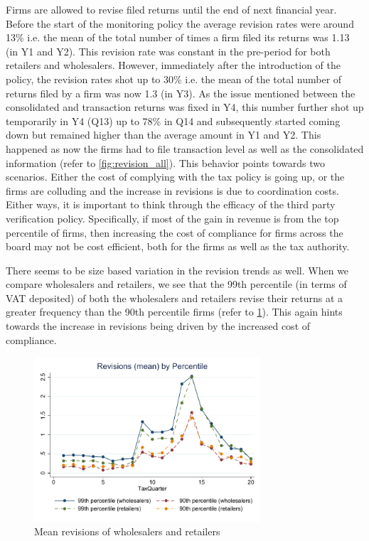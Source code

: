 Firms are allowed to revise filed returns until the end of next financial year. Before the start of the monitoring policy the average revision rates were around 13\% i.e. the mean of the total number of times a firm filed its returns was 1.13 (in Y1 and Y2). This revision rate was constant in the pre-period for both retailers and
wholesalers. However, immediately after the introduction of the policy, the revision rates shot up to 30\% i.e. the mean of the total number of returns filed by a firm was now 1.3 (in Y3). As the issue mentioned between the consolidated and transaction returns was fixed in Y4, this number further shot up temporarily in Y4 (Q13) up to 78\% in Q14 and subsequently started coming down but remained higher than the average amount in Y1 and Y2.  This happened as now the firms had to file transaction level as well as the consolidated information (refer to \cref{fig:revision_all}). This behavior points towards two scenarios. Either the cost of complying with the tax policy is going up, or the firms are colluding and the increase in revisions is due to coordination costs. Either ways, it is important to think through the efficacy of the third party verification policy. Specifically, if most of the gain in revenue is from the top percentile of firms, then increasing the cost of compliance for firms across the board may not be cost efficient, both for the firms as well as the tax authority.

There seems to be size based variation in the revision trends as well. When we compare wholesalers and retailers, we see that the 99th percentile (in terms of VAT deposited) of both the wholesalers and retailers revise their returns at a greater frequency than the 90th percentile firms (refer to \cref{fig:revision_topdecile}). This again hints towards the increase in revisions being driven by the increased cost of compliance.

\begin{figure}[h] 
\centering
\includegraphics[width=0.75\textwidth]{graphs/RevisionsWholesSalerVsRetailerTopPercentile.pdf}
\caption{Mean revisions of wholesalers and retailers}
\label{fig:revision_topdecile}
\end{figure}

